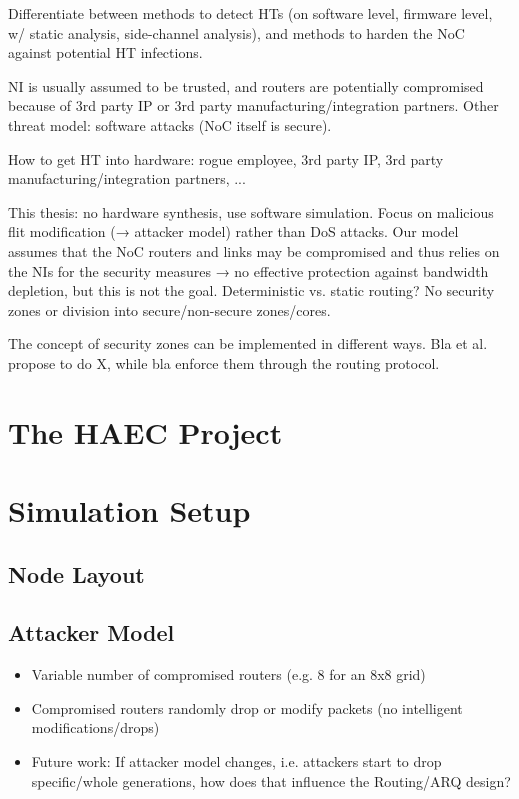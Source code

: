 \documentclass[
	paper=a4,
	fontsize=11pt,
	parskip=full %
]{scrreprt}
\begin{document}
    Differentiate between methods to detect HTs (on software level, firmware level, w/ static analysis, side-channel analysis), and methods to harden
    the NoC against potential HT infections.

    NI is usually assumed to be trusted, and routers are potentially compromised because of 3rd party IP or 3rd party manufacturing/integration
    partners. Other threat model: software attacks (NoC itself is secure).

    How to get HT into hardware: rogue employee, 3rd party IP, 3rd party manufacturing/integration partners, ...

    This thesis: no hardware synthesis, use software simulation. Focus on malicious flit modification (→ attacker model) rather than DoS attacks. Our
    model assumes that the NoC routers and links may be compromised and thus relies on the NIs for the security measures → no effective protection
    against bandwidth depletion, but this is not the goal.
    Deterministic vs. static routing? No security zones or division into secure/non-secure zones/cores.
    
    The concept of security zones can be implemented in different ways. Bla et al. propose to do X, while bla enforce them through the routing protocol.

    \chapter{The HAEC Project}

    \chapter{Simulation Setup}
    \section{Node Layout}

    \section{Attacker Model}
    \begin{itemize}
        \item Variable number of compromised routers (e.g. 8 for an 8x8 grid)
        \item Compromised routers randomly drop or modify packets (no intelligent modifications/drops)
        \item Future work: If attacker model changes, i.e. attackers start to drop specific/whole generations,
            how does that influence the Routing/ARQ design?
    \end{itemize}
\end{document}
